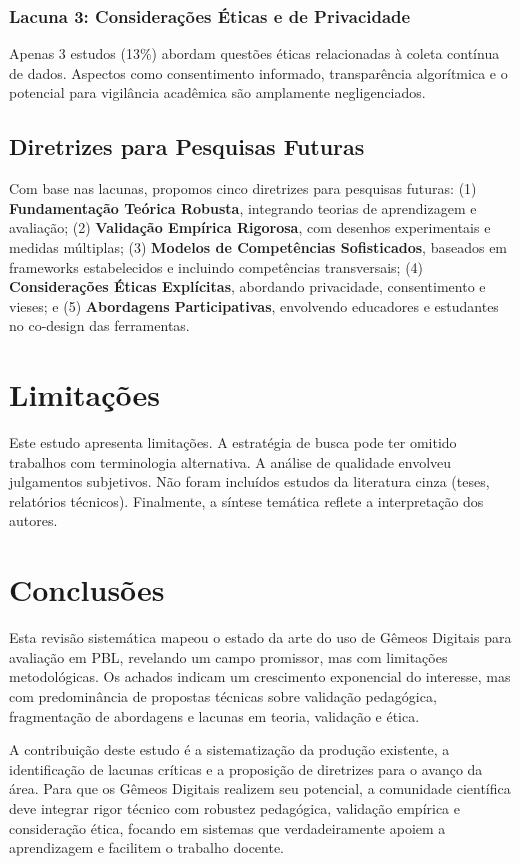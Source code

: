 \documentclass[english, spanish, brazilian]{RBIEarticle} %
\begin{document}
\subsubsection{Lacuna 3: Considerações Éticas e de Privacidade}

Apenas 3 estudos (13\%) abordam questões éticas relacionadas à coleta contínua de dados. Aspectos como consentimento informado, transparência algorítmica e o potencial para vigilância acadêmica são amplamente negligenciados.

\subsection{Diretrizes para Pesquisas Futuras}

Com base nas lacunas, propomos cinco diretrizes para pesquisas futuras: (1) \textbf{Fundamentação Teórica Robusta}, integrando teorias de aprendizagem e avaliação; (2) \textbf{Validação Empírica Rigorosa}, com desenhos experimentais e medidas múltiplas; (3) \textbf{Modelos de Competências Sofisticados}, baseados em frameworks estabelecidos e incluindo competências transversais; (4) \textbf{Considerações Éticas Explícitas}, abordando privacidade, consentimento e vieses; e (5) \textbf{Abordagens Participativas}, envolvendo educadores e estudantes no co-design das ferramentas.

\section{Limitações}

Este estudo apresenta limitações. A estratégia de busca pode ter omitido trabalhos com terminologia alternativa. A análise de qualidade envolveu julgamentos subjetivos. Não foram incluídos estudos da literatura cinza (teses, relatórios técnicos). Finalmente, a síntese temática reflete a interpretação dos autores.

\section{Conclusões}

Esta revisão sistemática mapeou o estado da arte do uso de Gêmeos Digitais para avaliação em PBL, revelando um campo promissor, mas com limitações metodológicas. Os achados indicam um crescimento exponencial do interesse, mas com predominância de propostas técnicas sobre validação pedagógica, fragmentação de abordagens e lacunas em teoria, validação e ética.

A contribuição deste estudo é a sistematização da produção existente, a identificação de lacunas críticas e a proposição de diretrizes para o avanço da área. Para que os Gêmeos Digitais realizem seu potencial, a comunidade científica deve integrar rigor técnico com robustez pedagógica, validação empírica e consideração ética, focando em sistemas que verdadeiramente apoiem a aprendizagem e facilitem o trabalho docente.


\printbibliography
\end{document}
